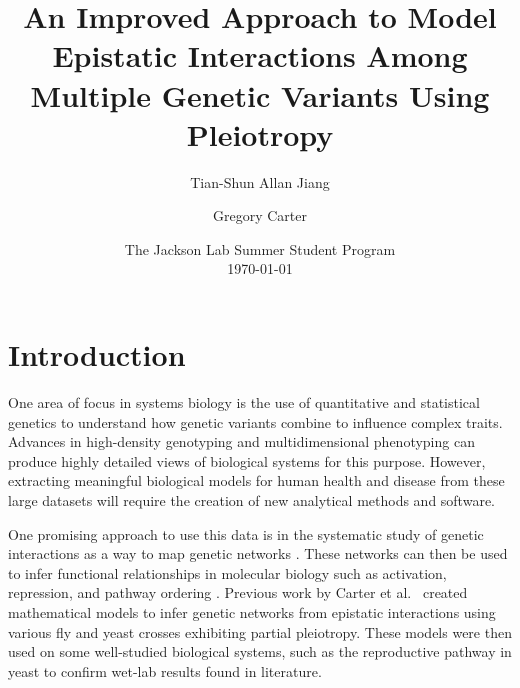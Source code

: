 \documentclass[letterpaper, 12pt]{article}
\begin{document}
\title{\vspace{30mm}An Improved Approach to Model Epistatic Interactions Among Multiple Genetic Variants Using Pleiotropy}
\author{\vspace{20mm}Tian-Shun Allan Jiang}


\author{Gregory Carter}

\date{The Jackson Lab Summer Student Program\\
\vspace{5mm} \today}

\singlespace
\maketitle

\listoftodos

\newpage

\doublespace

\section*{Introduction}

One area of focus in systems biology is the use of quantitative and statistical genetics to understand how genetic variants combine to influence complex traits. Advances in high-density genotyping and multidimensional phenotyping can produce highly detailed views of biological systems for this purpose. However, extracting meaningful biological models for human health and disease from these large datasets will require the creation of new analytical methods and software.

One promising approach to use this data is in the systematic study of genetic interactions as a way to map genetic networks \cite{boone2007}. These networks can then be used to infer functional relationships in molecular biology such as activation, repression, and pathway ordering \cite{avery1992ordering}. Previous work by Carter et al.\ \cite{carter2013fly,carter2012yeast} created mathematical models to infer genetic networks from epistatic interactions using various fly and yeast crosses exhibiting partial pleiotropy. These models were then used on some well-studied biological systems, such as the reproductive pathway in yeast \cite{carter2012yeast} to confirm wet-lab results found in literature.
\end{document}
